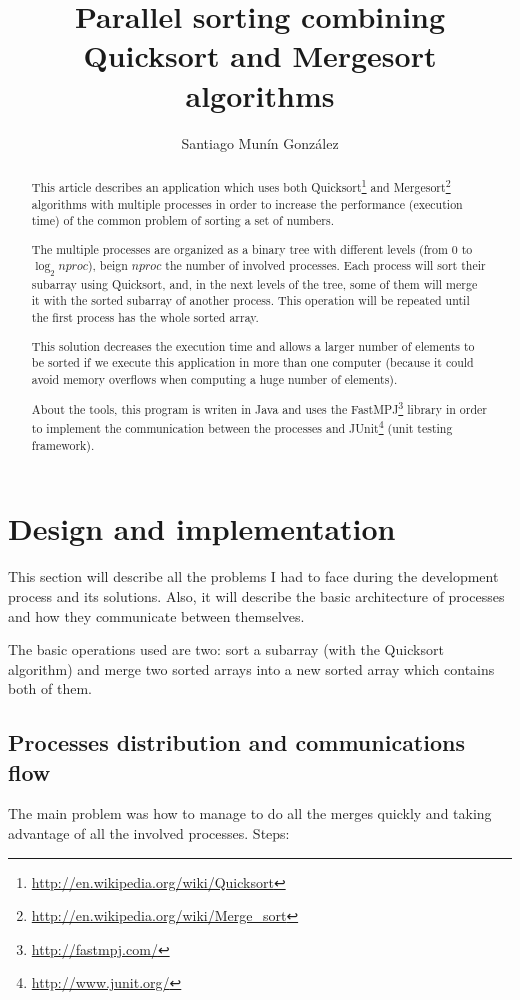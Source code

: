 \documentclass[a4paper,10pt]{article}
\title{Parallel sorting combining Quicksort and Mergesort algorithms}
\author{Santiago Munín González}
\begin{document}
\maketitle
\clearpage
\begin{abstract}
  This article describes an application which uses both Quicksort\footnote{\url{http://en.wikipedia.org/wiki/Quicksort}} and Mergesort\footnote{\url{http://en.wikipedia.org/wiki/Merge_sort}} algorithms 
  with multiple processes in order to increase the performance (execution time) of the common problem of sorting a set of numbers.
  
  The multiple processes are organized as a binary tree with different levels (from 0 to $\log_2 nproc$), 
  beign $nproc$ the number of involved processes. Each process will sort their subarray using Quicksort, and, in the next levels of the tree,
  some of them will merge it with the sorted subarray of another process. This operation will be repeated until the first process has the whole sorted array. 
  
  This solution decreases the execution time and allows a larger number of elements to be sorted if we execute this application 
  in more than one computer (because it could avoid memory overflows when computing a huge number of elements).
  
  About the tools, this program is writen in Java and uses the FastMPJ\footnote{\url{http://fastmpj.com/}} library in order to implement the communication between the processes and 
  JUnit\footnote{\url{http://www.junit.org/}} (unit testing framework).
  
\end{abstract}
\clearpage

\section{Design and implementation}
  This section will describe all the problems I had to face during the development process and its solutions. Also, it will describe the basic architecture of
  processes and how they communicate between themselves.
  
  The basic operations used are two: sort a subarray (with the Quicksort algorithm) and merge two sorted arrays into a new sorted array 
  which contains both of them.
  
  \subsection{Processes distribution and communications flow}
    The main problem was how to manage to do all the merges quickly and taking advantage of all the involved processes.
    Steps:
    
\end{document}
